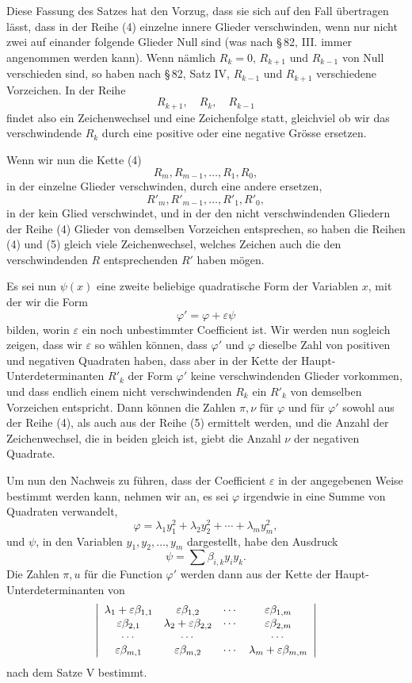 \documentclass[11pt]{article}
\begin{document}
Diese Fassung des Satzes hat den Vorzug, dass sie sich auf den Fall \"ubertragen l\"asst, dass in der Reihe (4) einzelne innere Glieder verschwinden, wenn nur nicht zwei auf einander folgende Glieder Null sind (was nach \S\,82, III. immer angenommen werden kann). Wenn n\"amlich $R_k=0$, $R_{k+1}$ und $R_{k-1}$ von Null verschieden sind, so haben nach \S\,82, Satz IV, $R_{k-1}$ und $R_{k+1}$ verschiedene Vorzeichen. In der Reihe
\[
        R_{k+1},\quad R_k,
\quad R_{k-1}
\]
findet also ein Zeichenwechsel und eine Zeichenfolge statt, gleichviel ob wir das verschwindende $R_k$ durch eine positive oder eine negative Gr\"osse ersetzen.

Wenn wir nun die Kette (4)
\[
        R_m,
        R_{m-1},
        \ldots,R_1,R_0,
\]
in der einzelne Glieder verschwinden, durch eine andere ersetzen,
\begin{equation}
        R'_m,
        R'_{m-1},
        \ldots,R'_1,R'_0,
\tag{5}
\end{equation}
in der kein Glied verschwindet, und in der den nicht verschwindenden Gliedern der Reihe (4) Glieder von demselben Vorzeichen entsprechen, so haben die Reihen (4) und (5) gleich viele Zeichenwechsel, welches Zeichen auch die den verschwindenden $R$ entsprechenden $R'$ haben m\"ogen.

Es sei nun $\psi(x)$ eine zweite beliebige quadratische Form der Variablen $x$, mit der wir die Form
\begin{equation}
        \varphi'=\varphi+\varepsilon\psi
\tag{6}
\end{equation}
bilden, worin $\varepsilon$ ein noch unbestimmter Coefficient ist. Wir werden nun sogleich zeigen, dass wir $\varepsilon$ so w\"ahlen k\"onnen, dass $\varphi'$ und $\varphi$ dieselbe Zahl von positiven und negativen Quadraten haben, dass aber in der Kette der Haupt-Unterdeterminanten $R'_k$ der Form $\varphi'$ keine verschwindenden Glieder vorkommen, und dass endlich einem nicht verschwindenden $R_k$ ein $R'_k$ von demselben Vorzeichen entspricht. Dann k\"onnen die Zahlen $\pi,\nu$ f\"ur $\varphi$ und f\"ur $\varphi'$ sowohl aus der Reihe (4), als auch aus der Reihe (5) ermittelt werden, und die Anzahl der Zeichenwechsel, die in beiden gleich ist, giebt die Anzahl $\nu$ der negativen Quadrate.

Um nun den Nachweis zu f\"uhren, dass der Coefficient $\varepsilon$ in der angegebenen Weise bestimmt werden kann, nehmen wir an, es sei $\varphi$ irgendwie in eine Summe von Quadraten verwandelt,
\[
        \varphi=\lambda_1y_1^2+\lambda_2y_2^2+\cdots+\lambda_my_m^2,
\]
und $\psi$, in den Variablen $y_1,y_2,
\ldots,y_m$ dargestellt, habe den Ausdruck
\[
        \psi=\sum \beta_{i,k}y_i y_k.
\]
Die Zahlen $\pi,
u$ f\"ur die Function $\varphi'$ werden dann aus der Kette der Haupt-Unterdeterminanten von
\[
\left|\begin{array}{cccc}
 \lambda_1+\varepsilon\beta_{1,1}&\varepsilon\beta_{1,2}&\cdots&\varepsilon\beta_{1,m}\cr
 \varepsilon\beta_{2,1}&\lambda_2+\varepsilon\beta_{2,2}&\cdots&\varepsilon\beta_{2,m}\cr
 \cdots&\cdots&&\cdots\cr
 \varepsilon\beta_{m,1}&\varepsilon\beta_{m,2}&\cdots&\lambda_m+\varepsilon\beta_{m,m}
\end{array}\right|
\]
nach dem Satze V bestimmt.
\end{document}
